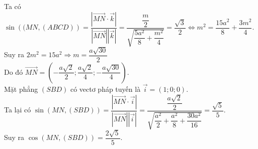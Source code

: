 \begin{ex}
{		Ta có $\sin\left((MN,(ABCD)\right)=\dfrac{\left|\overrightarrow{MN}\cdot\overrightarrow{k} \right|}{\left|\overrightarrow{MN} \right|\left|\overrightarrow{k} \right|} =\dfrac{\dfrac{m}{2}}{\sqrt{\dfrac{5a^2}{8}+\dfrac{m^2}{4}}} =\dfrac{\sqrt{3}}{2} \Leftrightarrow m^2=\dfrac{15a^2}{8}+\dfrac{3m^2}{4}$.\\
		Suy ra $2m^2=15a^2 \Rightarrow m=\dfrac{a\sqrt{30}}{2}$ \\
		Do đó $\overrightarrow{MN} =\left(-\dfrac{a\sqrt{2}}{2};\dfrac{a\sqrt{2}}{4};-\dfrac{a\sqrt{30}}{4}\right)$.\\
		Mặt phẳng $(SBD)$ có vectơ pháp tuyến là $\overrightarrow{i}=(1;0;0)$.\\
		Ta lại có $\sin\left(MN,(SBD)\right) =\dfrac{\left|\overrightarrow{MN}\cdot\overrightarrow{i}\right|}{\left|\overrightarrow{MN}\right|\left|\overrightarrow{i}\right|} =\dfrac{\dfrac{a\sqrt{2}}{2}}{\sqrt{\dfrac{a^2}{2}+\dfrac{a^2}{8}+\dfrac{30a^2}{16}}} =\dfrac{\sqrt{5}}{5}$.\\
		Suy ra $\cos\left(MN,(SBD)\right) =\dfrac{2\sqrt{5}}{5}$.
	}
\end{ex}

